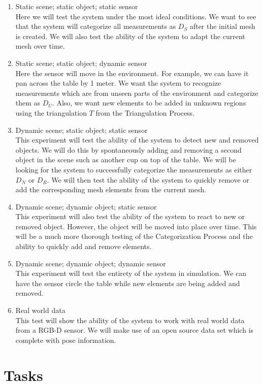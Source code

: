 \documentclass[12pt]{article}
\begin{document}
\begin{enumerate}
\item Static scene; static object; static sensor \\
Here we will test the system under the most ideal conditions. We want to
see that the system will categorize all measurements as $D_S$ after the
initial mesh is created. We will also test the ability of the system to
adapt the current mesh over time.  
\item Static scene; static object; dynamic sensor \\
Here the sensor will move in the environment. For example, we can have it
pan across the table by 1 meter. We want the system to recognize
measurements which are from unseen parts of the environment and categorize
them as $D_U$. Also, we want new elements to be added in unknown regions
using the triangulation $T$ from the Triangulation Process.  
\item Dynamic scene; static object; static sensor \\
This experiment will test the ability of the system to detect new and
removed objects. We will do this by spontaneously adding and removing a
second object in the scene such as another cup on top of the table. We will
be looking for the system to successfully categorize the measurements as
either $D_N$ or $D_R$. We will then test the ability of the system to
quickly remove or add the corresponding mesh elements from the current
mesh. 
\item Dynamic scene; dynamic object; static sensor \\
This experiment will also test the ability of the system to react to new or
removed object. However, the object will be moved into place over time. This
will be a much more thorough testing of the Categorization Process and the
ability to quickly add and remove elements. 
\item Dynamic scene; dynamic object; dynamic sensor \\
This experiment will test the entirety of the system in simulation. We can
have the sensor circle the table while new elements are being added and
removed. 
\item Real world data \\ 
This test will show the ability of the system to work with real world data
from a RGB-D sensor. We will make use of an open source data set which is
complete with pose information. 
\end{enumerate}

\section{Tasks}
\label{ch:tasks}
\end{document}
